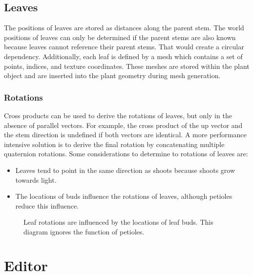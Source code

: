 \documentclass[10pt]{article}
\begin{document}
\subsection{Leaves}
The positions of leaves are stored as distances along the parent stem. The world positions of leaves can only be determined if the parent stems are also known because leaves cannot reference their parent stems. That would create a circular dependency. Additionally, each leaf is defined by a mesh which contains a set of points, indices, and texture coordinates. These meshes are stored within the plant object and are inserted into the plant geometry during mesh generation.

\subsubsection{Rotations}
\begin{minipage}[t]{0.6\textwidth}
Cross products can be used to derive the rotations of leaves, but only in the absence of parallel vectors. For example, the cross product of the up vector and the stem direction is undefined if both vectors are identical. A more performance intensive solution is to derive the final rotation by concatenating multiple quaternion rotations. Some considerations to determine to rotations of leaves are:
\begin{itemize}
\item Leaves tend to point in the same direction as shoots because shoots grow towards light.
\item The locations of buds influence the rotations of leaves, although petioles reduce this influence.
\end{itemize}
\end{minipage}
\hfill
\begin{minipage}[t]{0.3\textwidth}
 \begin{figure}[H]
  \centering
  
  \caption{Leaf rotations are influenced by the locations of leaf buds. This diagram ignores the function of petioles.}
 \end{figure}
\end{minipage}

\pagebreak
\section{Editor}
\end{document}

